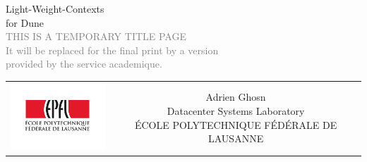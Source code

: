 \begin{titlepage}
\begin{center}
\sffamily


\null\vspace{2cm}
{\huge Light-Weight-Contexts \\[12pt] for Dune} \\[24pt] 
\textcolor{gray}{\small{THIS IS A TEMPORARY TITLE PAGE \\ It will be replaced for the final print by a version \\ provided by the service academique.}}
    
\vfill

\begin{tabular} {cc}
\parbox{0.3\textwidth}{\includegraphics[width=4cm]{images/epfl}}
&
\parbox{0.7\textwidth}{%
	\null Adrien Ghosn\\[9pt]
	Datacenter Systems Laboratory\\ 
	ÉCOLE POLYTECHNIQUE FÉDÉRALE DE LAUSANNE\\
	
%
}
\end{tabular}
\end{center}
\vspace{2cm}
\end{titlepage}




